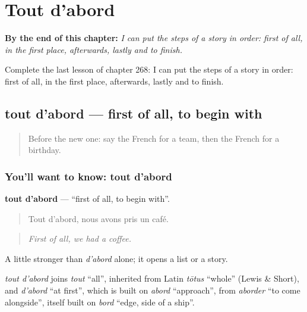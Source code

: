 
\chapter{Tout d'abord}
\label{ch:fr-tout-d-abord}

\begin{chapteropening}
\textbf{By the end of this chapter:} \emph{I can put the steps of a story in order: first of all, in the first place, afterwards, lastly and to finish.}

Complete the last lesson of chapter 268: I can put the steps of a story in order: first of all, in the first place, afterwards, lastly and to finish.
\end{chapteropening}

\section[tout d'abord]{tout d'abord — first of all, to begin with}

\label{lesson:FR-C268-tout-d-abord}



\begin{quote}
Before the new one: say the French for a team, then the French for a birthday.
\end{quote}

\subsection*{You'll want to know: tout d'abord}
\textbf{tout d'abord} — \textquotedblleft{}first of all, to begin with\textquotedblright{}.

\begin{quote}
Tout d'abord, nous avons pris un café.
\end{quote}

\begin{quote}
\emph{First of all, we had a coffee.}
\end{quote}

A little stronger than \emph{d'abord} alone; it opens a list or a story.

\begin{cousinweb}
\emph{tout d'abord} joins \emph{tout} \textquotedblleft{}all\textquotedblright{}, inherited from Latin \emph{tōtus} \textquotedblleft{}whole\textquotedblright{} (Lewis \& Short), and \emph{d'abord} \textquotedblleft{}at first\textquotedblright{}, which is built on \emph{abord} \textquotedblleft{}approach\textquotedblright{}, from \emph{aborder} \textquotedblleft{}to come alongside\textquotedblright{}, itself built on \emph{bord} \textquotedblleft{}edge, side of a ship\textquotedblright{}.
\end{cousinweb}

